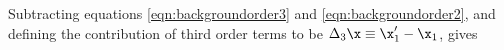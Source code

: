 Subtracting equations \ref{eqn:backgroundorder3} and \ref{eqn:backgroundorder2}, and defining the contribution of third order terms to be $\Delta_3 \x \equiv \x'_1 - \x_1$, gives
  
  
  
  
  
  
  